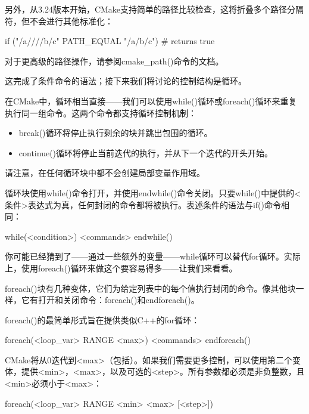 另外，从3.24版本开始，CMake支持简单的路径比较检查，这将折叠多个路径分隔符，但不会进行其他标准化：

\begin{cmake}
if ("/a////b/c" PATH_EQUAL "/a/b/c") # returns true
\end{cmake}

对于更高级的路径操作，请参阅cmake\_path()命令的文档。

这完成了条件命令的语法；接下来我们将讨论的控制结构是循环。


在CMake中，循环相当直接——我们可以使用while()循环或foreach()循环来重复执行同一组命令。这两个命令都支持循环控制机制：

\begin{itemize}
\item
break()循环将停止执行剩余的块并跳出包围的循环。

\item
continue()循环将停止当前迭代的执行，并从下一个迭代的开头开始。
\end{itemize}

请注意，在任何循环块中都不会创建局部变量作用域。


循环块使用while()命令打开，并使用endwhile()命令关闭。只要while()中提供的<条件>表达式为真，任何封闭的命令都将被执行。表述条件的语法与if()命令相同：

\begin{shell}
while(<condition>)
    <commands>
endwhile()
\end{shell}

你可能已经猜到了——通过一些额外的变量——while循环可以替代for循环。实际上，使用foreach()循环来做这个要容易得多——让我们来看看。


foreach()块有几种变体，它们为给定列表中的每个值执行封闭的命令。像其他块一样，它有打开和关闭命令：foreach()和endforeach()。

foreach()的最简单形式旨在提供类似C++的for循环：

\begin{shell}
foreach(<loop_var> RANGE <max>)
    <commands>
endforeach()
\end{shell}

CMake将从0迭代到<max>（包括）。如果我们需要更多控制，可以使用第二个变体，提供<min>，<max>，以及可选的<step>。所有参数都必须是非负整数，且<min>必须小于<max>：

\begin{shell}
foreach(<loop_var> RANGE <min> <max> [<step>])
\end{shell}

